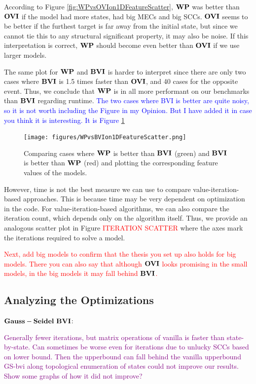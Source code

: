 According to Figure \ref{fig:WPvsOVIon1DFeatureScatter}, $\WP$ was better than $\mathbf{OVI}$ if the model had more states, had big MECs and big SCCs.
$\mathbf{OVI}$ seems to be better if the furthest target is far away from the initial state, but since we cannot tie this to any structural significant property,
it may also be noise. If this interpretation is correct, $\WP$ should become even better than $\mathbf{OVI}$ if we use larger models.

The same plot for $\WP$ and $\BVI$ is harder to interpret since there are only two cases where $\BVI$ is 1.5 times faster than $\mathbf{OVI}$, and 40 cases
for the opposite event. Thus, we conclude that $\WP$ is in all more performant on our benchmarks than $\BVI$ regarding runtime. 
\textcolor{blue}{The two cases where BVI is better are quite noisy, so it is not worth including the Figure in my Opinion.
But I have added it in case you think it is interesting. It is Figure \ref{fig:WPvsBVIon1DFeatureScatter}}

\begin{figure}[t]
    \centering
    \texttt{[image: figures/WPvsBVIon1DFeatureScatter.png]}
    \caption[$\WP$ compared to $\BVI$]{
        Comparing cases where $\WP$ is better than $\BVI$ (green) and $\BVI$ is better than $\WP$ (red) 
        and plotting the corresponding feature values of the models.
    }
    \label{fig:WPvsBVIon1DFeatureScatter}
\end{figure}


However, time is not the best measure we can use to compare value-iteration-based approaches. 
This is because time may be very dependent on optimization in the code. 
For value-iteration-based algorithms, we can also compare the iteration count, which depends only on the algorithm itself.
Thus, we provide an analogous scatter plot in Figure \textcolor{red}{ITERATION SCATTER} where the axes mark the iterations required to solve a model.

\textcolor{red}{Next, add big models to confirm that the thesis you set up also holds for big models. 
There you can also say that although $\mathbf{OVI}$ looks promising in the small models, in the big models it may fall behind $\BVI$.}

\subsection{Analyzing the Optimizations}

$\mathbf{Gauss-Seidel} \ \mathbf{BVI}$:

\textcolor{purple}{Generally fewer iterations, but matrix operations of vanilla is faster than state-by-state.
Can sometimes be worse even for iterations due to unlucky SCCs based on lower bound. Then the upperbound can fall behind the vanilla upperbound
GS-bvi along topological enumeration of states could not improve our results. Show some graphs of how it did not improve?}

